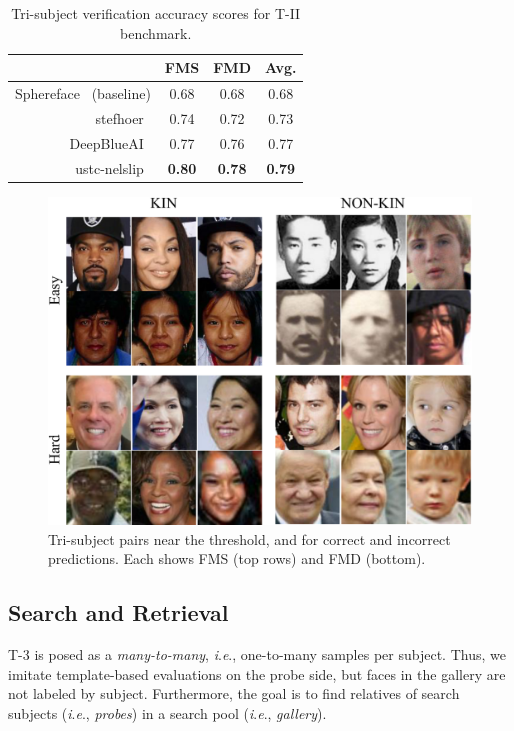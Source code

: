 \documentclass[letterpaper, 10 pt, conference]{ieeeconf}  %
\newcommand{\ie}{\textit{i}.\textit{e}., }
\begin{document}
\begin{table}[b]
\scriptsize
\centering
\caption {Tri-subject verification accuracy scores for T-II benchmark.}%
\label{tab:benchmark:track2}
\begin{tabular}{r|cc|c}
  &FMS & FMD & Avg. \\
  \midrule
  
  Sphereface~\cite{Liu_2017_CVPR} (baseline) & 0.68 & 0.68 & 0.68 \\ 
    stefhoer~\cite{id2} & 0.74 & 0.72 & 0.73 \\
  DeepBlueAI~\cite{id3}  & 0.77 & 0.76 & 0.77 \\
 ustc-nelslip~\cite{id6}  & \textbf{0.80} & \textbf{0.78} & \textbf{0.79} \\
\end{tabular}
\end{table}


\begin{figure}[t!]
    \centering
    \includegraphics[width = .9\linewidth]{figures/tri-montage-crop.pdf}
    \caption{Tri-subject pairs near the threshold, and for correct and incorrect predictions. Each shows FMS (top rows) and FMD (bottom).}
    \label{fig:track2:montage}
\end{figure}



\subsection{Search and Retrieval}\label{sec:search}
T-3 is posed as a \textit{many-to-many}, \ie one-to-many samples per subject. Thus, we imitate template-based evaluations on the probe side, but faces in the gallery are not labeled by subject. Furthermore, the goal is to find relatives of search subjects (\ie \textit{probes}) in a search pool (\ie \textit{gallery}).
\end{document}
